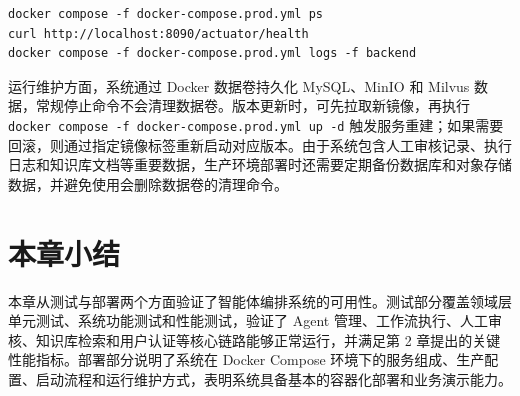 \begin{lstlisting}[style=bash, caption={部署后运行状态检查命令}]
docker compose -f docker-compose.prod.yml ps
curl http://localhost:8090/actuator/health
docker compose -f docker-compose.prod.yml logs -f backend
\end{lstlisting}

运行维护方面，系统通过 Docker 数据卷持久化 MySQL、MinIO 和 Milvus 数据，常规停止命令不会清理数据卷。版本更新时，可先拉取新镜像，再执行 \texttt{docker compose -f docker-compose.prod.yml up -d} 触发服务重建；如果需要回滚，则通过指定镜像标签重新启动对应版本。由于系统包含人工审核记录、执行日志和知识库文档等重要数据，生产环境部署时还需要定期备份数据库和对象存储数据，并避免使用会删除数据卷的清理命令。

\section{本章小结}

本章从测试与部署两个方面验证了智能体编排系统的可用性。测试部分覆盖领域层单元测试、系统功能测试和性能测试，验证了 Agent 管理、工作流执行、人工审核、知识库检索和用户认证等核心链路能够正常运行，并满足第 2 章提出的关键性能指标。部署部分说明了系统在 Docker Compose 环境下的服务组成、生产配置、启动流程和运行维护方式，表明系统具备基本的容器化部署和业务演示能力。
